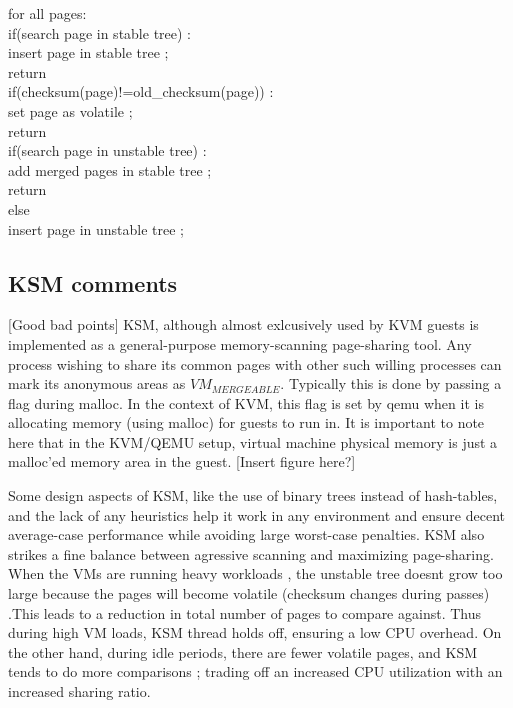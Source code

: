 \documentclass[10pt,a4paper]{article}
\begin{document}
for all pages: \\
   if(search page in stable tree) : \\
       insert page in stable tree ; \\
       return \\
   if(checksum(page)!=old\_checksum(page)) : \\
       set page as volatile ; \\
       return \\
   if(search page in unstable tree) : \\
       add merged pages in stable tree ; \\
       return \\
   else \\
       insert page in unstable tree ; \\
 

\subsection{KSM comments}

[Good bad points]
KSM, although almost exlcusively used by KVM guests is implemented as a general-purpose memory-scanning page-sharing tool. Any process wishing to share its common pages with other such willing processes can mark its anonymous areas as $VM_{MERGEABLE}$. Typically this is done by passing a flag during malloc. 
In the context of KVM, this flag is set by qemu when it is allocating memory (using malloc) for guests to run in. It is important to note here that in the KVM/QEMU setup, virtual machine physical memory is just a malloc'ed memory area in the guest. 
[Insert figure here?]

Some design aspects of KSM, like the use of binary trees instead of hash-tables, and the lack of any heuristics help it work in any environment and ensure decent average-case performance while avoiding large worst-case penalties. KSM also strikes a fine balance between agressive scanning and maximizing page-sharing. When the VMs are running heavy workloads , the unstable tree doesnt grow too large because the pages will become volatile (checksum changes during passes) .This leads to a reduction in total number of pages to compare against. Thus during high VM loads, KSM thread holds off, ensuring a low CPU overhead. On the other hand, during idle periods, there are fewer volatile pages, and KSM tends to do more comparisons ; trading off an increased CPU utilization with an increased sharing ratio. 
\end{document}
